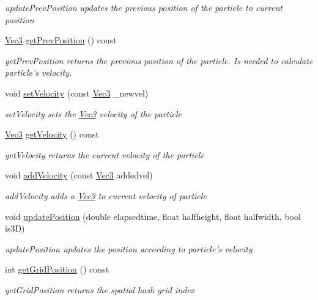 \begin{DoxyCompactItemize}
\begin{DoxyCompactList}\small\item\em update\-Prev\-Position updates the previous position of the particle to current position \end{DoxyCompactList}\item 
\hyperlink{classVec3}{Vec3} \hyperlink{classParticle_aebf5efcc9e99de91af2d728180017d48}{get\-Prev\-Position} () const 
\begin{DoxyCompactList}\small\item\em get\-Prev\-Position returns the previous position of the particle. Is needed to calculate particle's velocity. \end{DoxyCompactList}\item 
void \hyperlink{classParticle_ab91e3c3df102e08aa0394b2c7bd2df0e}{set\-Velocity} (const \hyperlink{classVec3}{Vec3} \-\_\-newvel)
\begin{DoxyCompactList}\small\item\em set\-Velocity sets the \hyperlink{classVec3}{Vec3} velocity of the particle \end{DoxyCompactList}\item 
\hyperlink{classVec3}{Vec3} \hyperlink{classParticle_a0fe52fbebe971ff5c4219f0ecf3b8941}{get\-Velocity} () const 
\begin{DoxyCompactList}\small\item\em get\-Velocity returns the current velocity of the particle \end{DoxyCompactList}\item 
void \hyperlink{classParticle_af86bd61b41085f3bb390bb6ddc0734d7}{add\-Velocity} (const \hyperlink{classVec3}{Vec3} addedvel)
\begin{DoxyCompactList}\small\item\em add\-Velocity adds a \hyperlink{classVec3}{Vec3} to current velocity of particle \end{DoxyCompactList}\item 
void \hyperlink{classParticle_ad316202f5c32510b970c2142c6ca65d1}{update\-Position} (double elapsedtime, float halfheight, float halfwidth, bool is3\-D)
\begin{DoxyCompactList}\small\item\em update\-Position updates the position according to particle's velocity \end{DoxyCompactList}\item 
int \hyperlink{classParticle_afcae0c2dba5f4158384448b9004ee88a}{get\-Grid\-Position} () const 
\begin{DoxyCompactList}\small\item\em get\-Grid\-Position returns the spatial hash grid index \end{DoxyCompactList}\item 

\end{DoxyCompactItemize}
